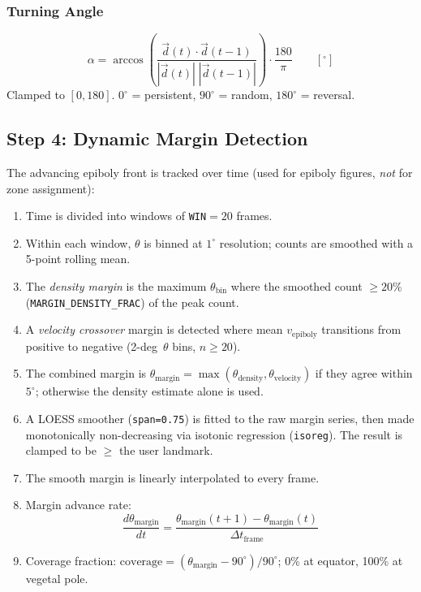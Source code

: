 \documentclass[11pt,a4paper]{article}
\newcommand{\param}[1]{\texttt{#1}}
\begin{document}
\subsubsection*{Turning Angle}
\[
  \alpha = \arccos\!\left(
    \frac{\vec{d}(t) \cdot \vec{d}(t-1)}
         {|\vec{d}(t)|\;|\vec{d}(t-1)|}
  \right) \cdot \frac{180}{\pi}
  \qquad [^\circ]
\]
Clamped to $[0,180]$.  $0^\circ$ = persistent, $90^\circ$ = random,
$180^\circ$ = reversal.

\subsection*{Step 4: Dynamic Margin Detection}
\label{sec:margin}

The advancing epiboly front is tracked over time (used for epiboly
figures, \emph{not} for zone assignment):

\begin{enumerate}[nosep]
  \item Time is divided into windows of \param{WIN}${}=20$ frames.
  \item Within each window, $\theta$ is binned at $1^\circ$ resolution;
        counts are smoothed with a 5-point rolling mean.
  \item The \emph{density margin} is the maximum $\theta_\mathrm{bin}$ where
        the smoothed count $\ge 20\%$ (\param{MARGIN\_DENSITY\_FRAC}) of the
        peak count.
  \item A \emph{velocity crossover} margin is detected where mean
        $v_\mathrm{epiboly}$ transitions from positive to negative
        (2-deg~$\theta$ bins, $n \ge 20$).
  \item The combined margin is
        $\theta_\mathrm{margin} = \max(\theta_\mathrm{density},
        \theta_\mathrm{velocity})$ if they agree within $5^\circ$;
        otherwise the density estimate alone is used.
  \item A LOESS smoother (\texttt{span=0.75}) is fitted to the raw margin
        series, then made monotonically non-decreasing via isotonic
        regression (\texttt{isoreg}).  The result is clamped to be $\ge$
        the user landmark.
  \item The smooth margin is linearly interpolated to every frame.
  \item Margin advance rate:
        \[
          \frac{d\theta_\mathrm{margin}}{dt}
          = \frac{\theta_\mathrm{margin}(t+1)-\theta_\mathrm{margin}(t)}
                 {\Delta t_\mathrm{frame}}
        \]
  \item Coverage fraction:
        $\mathrm{coverage} = (\theta_\mathrm{margin} - 90^\circ) / 90^\circ$;
        0\% at equator, 100\% at vegetal pole.
\end{enumerate}
\end{document}

